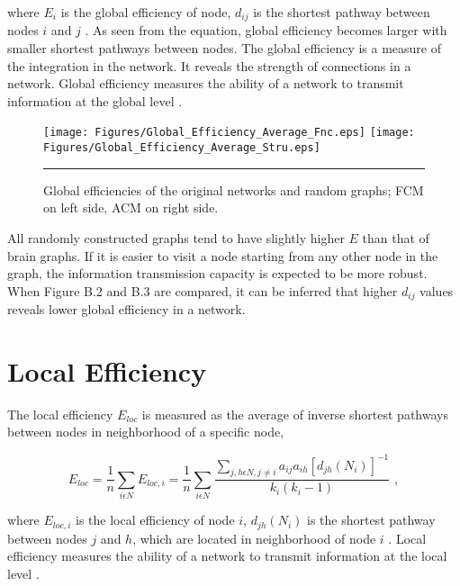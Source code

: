 where $E_i$ is the global efficiency of node, $d_{ij}$ is the shortest pathway between nodes $i$ and $j$ \citep{LAT01}. As seen from the equation, global efficiency becomes larger with smaller shortest pathways between nodes. The global efficiency is a measure of the integration in the network. It reveals the strength of connections in a network. Global efficiency measures the ability of a network to transmit information at the global level \citep{XYZDA}.


\begin{figure}[htbp]
 
  \centering
	 \texttt{[image: Figures/Global\_Efficiency\_Average\_Fnc.eps]}
	 \texttt{[image: Figures/Global\_Efficiency\_Average\_Stru.eps]}
	\rule{35em}{0.5pt}
  \caption[Global Efficiency]{Global efficiencies of the original networks and random graphs; FCM on left side, ACM on right side.} 
    \label{fig:Global Efficiency}
 	
\end{figure}

All randomly constructed graphs tend to have slightly higher $E$ than that of brain graphs. If it is easier to visit a node starting from any other node in the graph, the information transmission capacity is expected to be more robust. When Figure B.2 and B.3 are compared, it can be inferred that higher $d_{ij}$ values reveals lower global efficiency in a network. 



\section{Local Efficiency}
The local efficiency $E_{loc}$ is measured as the average of inverse shortest pathways between nodes in neighborhood of a specific node, 

\begin{equation}
E_{loc} = \frac{1}{n}\sum\limits_{i \epsilon N} E_{loc,i} = \frac{1}{n}\sum\limits_{i \epsilon N} \frac{\sum\limits_{j,h \epsilon N, j\neq i} a_{ij} a_{ih}[d_{jh}(N_i)]^{-1}}{k_i(k_i - 1) } \,\, ,
\end{equation}

where $E_{loc,i}$ is the local efficiency of node $i$, $d_{jh}(N_i)$ is the shortest pathway between nodes $j$ and $h$, which are located in neighborhood of node $i$ \citep{LAT01}. Local efficiency measures the ability of a network to transmit information at the local level \citep{XYZDA}.


